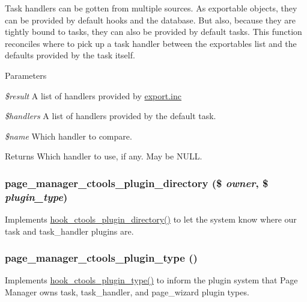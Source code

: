 Task handlers can be gotten from multiple sources. As exportable objects, they can be provided by default hooks and the database. But also, because they are tightly bound to tasks, they can also be provided by default tasks. This function reconciles where to pick up a task handler between the exportables list and the defaults provided by the task itself.


\begin{DoxyParams}{Parameters}
\item[{\em \$result}]A list of handlers provided by \hyperlink{export_8inc}{export.inc} \item[{\em \$handlers}]A list of handlers provided by the default task. \item[{\em \$name}]Which handler to compare. \end{DoxyParams}
\begin{DoxyReturn}{Returns}
Which handler to use, if any. May be NULL. 
\end{DoxyReturn}
\hypertarget{page__manager_8module_a5e41f5889b975464f474f3af5039dd4c}{
\subsubsection[{page\_\-manager\_\-ctools\_\-plugin\_\-directory}]{\setlength{\rightskip}{0pt plus 5cm}page\_\-manager\_\-ctools\_\-plugin\_\-directory (\$ {\em owner}, \/  \$ {\em plugin\_\-type})}}
\label{page__manager_8module_a5e41f5889b975464f474f3af5039dd4c}
Implements \hyperlink{group__hooks_gaf17a0de7a7ca6e6c30c766ea1e44715e}{hook\_\-ctools\_\-plugin\_\-directory()} to let the system know where our task and task\_\-handler plugins are. \hypertarget{page__manager_8module_a470533a07989fa3abd6ea7eb6a18c065}{
\subsubsection[{page\_\-manager\_\-ctools\_\-plugin\_\-type}]{\setlength{\rightskip}{0pt plus 5cm}page\_\-manager\_\-ctools\_\-plugin\_\-type ()}}
\label{page__manager_8module_a470533a07989fa3abd6ea7eb6a18c065}
Implements \hyperlink{group__hooks_gacb27d27849a3374ddda0120603d549ac}{hook\_\-ctools\_\-plugin\_\-type()} to inform the plugin system that Page Manager owns task, task\_\-handler, and page\_\-wizard plugin types.

